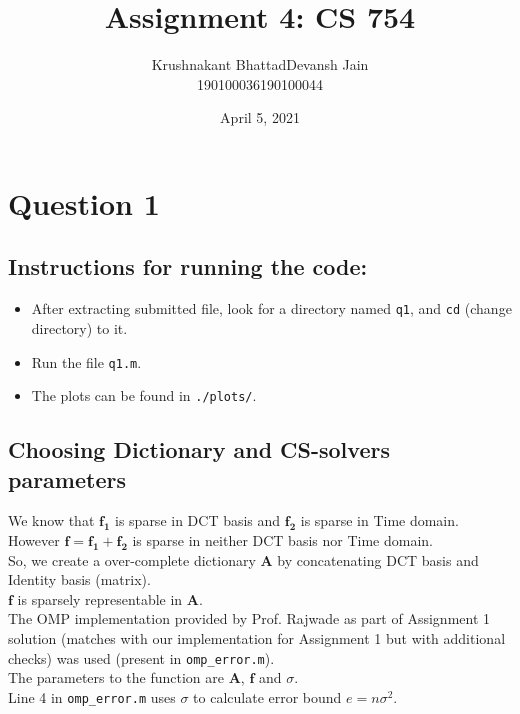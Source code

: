 \documentclass[fleqn, 11pt]{article}
\title{Assignment 4: CS 754}
\author{ 
\begin{tabular}{|c|c|}
     \hline
     \textsf{Krushnakant Bhattad} & \textsf{Devansh Jain} \\
     \hline
     \textsf{190100036} & \textsf{190100044}\\
     \hline
\end{tabular}
}
\date{April 5, 2021}
\begin{document}
\maketitle
\tableofcontents
\thispagestyle{empty}
\setcounter{page}{0}

\newpage
\section*{Question 1}
\setcounter{equation}{0}

\subsection*{Instructions for running the code:}
\begin{itemize}[noitemsep]
    \item After extracting submitted file, look for a directory named \texttt{q1}, and \texttt{cd} (change directory) to it.
    \item Run the file \texttt{q1.m}.
    \item The plots can be found in \texttt{./plots/}.
\end{itemize}

\bigskip

\subsection*{Choosing Dictionary and CS-solvers parameters}
We know that $\boldsymbol{f_1}$ is sparse in DCT basis and $\boldsymbol{f_2}$ is sparse in Time domain. \\
However $\boldsymbol{f} = \boldsymbol{f_1} + \boldsymbol{f_2}$ is sparse in neither DCT basis nor Time domain. \\
So, we create a over-complete dictionary $\boldsymbol{A}$ by concatenating DCT basis and Identity basis (matrix). \\
$\boldsymbol{f}$ is sparsely representable in $\boldsymbol{A}$.\\

The OMP implementation provided by Prof. Rajwade as part of Assignment 1 solution (matches with our implementation for Assignment 1 but with additional checks) was used (present in \texttt{omp\_error.m}). \\
The parameters to the function are $\boldsymbol{A}$, $\boldsymbol{f}$ and $\sigma$. \\
Line 4 in \texttt{omp\_error.m} uses $\sigma$ to calculate error bound $e = n \sigma^2$. \\
\end{document}
